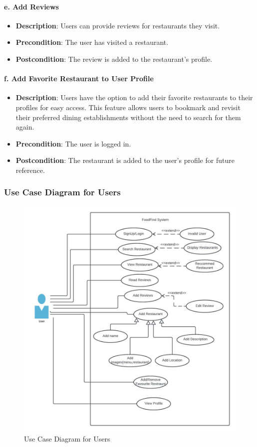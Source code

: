 \documentclass[12pt, a4paper, oneside]{article}
\begin{document}
\paragraph{e. Add Reviews}
\begin{itemize}
    \item \textbf{Description}: Users can provide reviews for restaurants they visit.
    \item \textbf{Precondition}: The user has visited a restaurant.
    \item \textbf{Postcondition}: The review is added to the restaurant’s profile.
\end{itemize}

\paragraph{f. Add Favorite Restaurant to User Profile}
\begin{itemize}
    \item \textbf{Description}: Users have the option to add their favorite restaurants to their profiles for easy access. This feature allows users to bookmark and revisit their preferred dining establishments without the need to search for them again.
    \item \textbf{Precondition}: The user is logged in.
    \item \textbf{Postcondition}: The restaurant is added to the user’s profile for future reference.
\end{itemize}

\subsubsection{Use Case Diagram for Users}
\begin{figure}[H]
    \centering
    \includegraphics[width=\textwidth,height=\textheight,keepaspectratio]{images/usecaseUser.jpeg}
    \caption{Use Case Diagram for Users}
    \label{fig:usecaseUser1}
\end{figure}
\pagebreak
\end{document}
